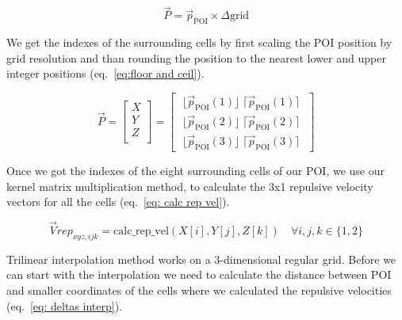 \documentclass[]{article}
\begin{document}
\begin{equation}
	\label{eq:scale grid}
	\vec{P} = \vec{p}_{\mathrm{POI}} \times\Delta \mathrm{grid}
\end{equation}

We get the indexes of the surrounding cells by first scaling the POI position by grid resolution and than rounding the position to the nearest lower and upper integer positions (eq.~\ref{eq:floor and ceil}).

%
%
	
	\begin{equation}
		\label{eq:floor and ceil}
		\vec{P} =
		\begin{bmatrix}
			X \\
			Y \\
			Z \\
		\end{bmatrix}
		=
		\begin{bmatrix}
			\; \lfloor \vec{p}_{\mathrm{POI}}(1) \rfloor \; \lceil \vec{p}_{\mathrm{POI}}(1) \rceil \;  \\
			\; \lfloor \vec{p}_{\mathrm{POI}}(2) \rfloor \; \lceil \vec{p}_{\mathrm{POI}}(2) \rceil \; \\
			\; \lfloor \vec{p}_{\mathrm{POI}}(3) \rfloor \; \lceil \vec{p}_{\mathrm{POI}}(3) \rceil \; 
		\end{bmatrix}
	\end{equation}

Once we got the indexes of the eight surrounding cells of our POI, we use our kernel matrix multiplication method, to calculate the 3x1 repulsive velocity vectors for all the cells (eq.~\ref{eq: calc rep vel}).

\begin{equation}
	\label{eq: calc rep vel}
	\vec{V}rep_{xyz,ijk} = \mathrm{calc\_rep\_vel}(X[i], Y[j], Z[k]) \quad \forall i, j, k \in \{1, 2\}
\end{equation}

Trilinear interpolation method works on a 3-dimensional regular grid. Before we can start with the interpolation we need to calculate the distance between POI and smaller coordinates of the cells where we calculated the repulsive velocities (eq.~\ref{eq: deltas interp}). 
\end{document}
